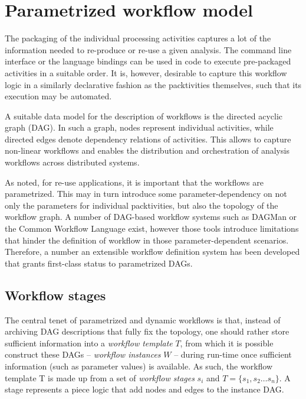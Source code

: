 \documentclass[a4paper]{jpconf}
\begin{document}
\section{Parametrized workflow model}

The packaging of the individual processing activities captures a lot of the information needed to re-produce or re-use a given analysis. The command line interface or the language bindings can be used in code to execute pre-packaged activities in a suitable order. It is, however, desirable to capture this workflow logic in a similarly declarative fashion as the packtivities themselves, such that its execution may be automated.

A suitable data model for the description of workflows is the directed acyclic graph (DAG). In such a graph, nodes represent individual activities, while directed edges denote dependency relations of activities. This allows to capture non-linear workflows and enables the distribution and orchestration of analysis workflows across distributed systems.

As noted, for re-use applications, it is important that the workflows are parametrized. This may in turn introduce some parameter-dependency on not only the parameters for individual packtivities, but also the topology of the workflow graph. A number of DAG-based workflow systems such as DAGMan or the Common Workflow Language \cite{HTCondorDAGMan,Amstutz2016} exist, however those tools introduce limitations that hinder the definition of workflow in those parameter-dependent scenarios. Therefore, a number an extensible workflow definition system has been developed that grants first-class status to parametrized DAGs.

\subsection{Workflow stages}

The central tenet of parametrized and dynamic workflows is that, instead of archiving DAG descriptions that fully fix the topology, one should rather store sufficient information into a \emph{workflow template} $T$, from which it is possible construct these DAGs -- \emph{workflow instances} $W$ -- during run-time once sufficient information (such as parameter values) is available. As such, the workflow template T is made up from a set of \emph{workflow stages} $s_i$ and $T = \{s_1,s_2\dots s_n\}$. A stage represents a piece logic that add nodes and edges to the instance DAG.
\end{document}
